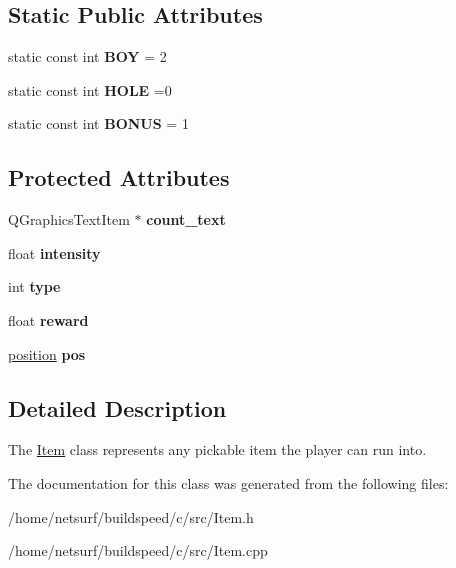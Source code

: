 \subsection*{Static Public Attributes}
\begin{DoxyCompactItemize}
\item 
static const int {\bfseries B\+OY} = 2\hypertarget{class_item_a70873a5ab783160390c311623837b5a5}{}\label{class_item_a70873a5ab783160390c311623837b5a5}

\item 
static const int {\bfseries H\+O\+LE} =0\hypertarget{class_item_abd114fce352b909292f0cf6dc89b4487}{}\label{class_item_abd114fce352b909292f0cf6dc89b4487}

\item 
static const int {\bfseries B\+O\+N\+US} = 1\hypertarget{class_item_a76b7a450081315e261c475736dfb74a3}{}\label{class_item_a76b7a450081315e261c475736dfb74a3}

\end{DoxyCompactItemize}
\subsection*{Protected Attributes}
\begin{DoxyCompactItemize}
\item 
Q\+Graphics\+Text\+Item $\ast$ {\bfseries count\+\_\+text}\hypertarget{class_item_ae17075ec9a03088db6f561c4f9c76742}{}\label{class_item_ae17075ec9a03088db6f561c4f9c76742}

\item 
float {\bfseries intensity}\hypertarget{class_item_a27b5db0436c59d6c8f91c3bc787bf793}{}\label{class_item_a27b5db0436c59d6c8f91c3bc787bf793}

\item 
int {\bfseries type}\hypertarget{class_item_a22a98aed7ce8f0314b597a5739c415b7}{}\label{class_item_a22a98aed7ce8f0314b597a5739c415b7}

\item 
float {\bfseries reward}\hypertarget{class_item_a96e9e465bc41c9b5b775281771019587}{}\label{class_item_a96e9e465bc41c9b5b775281771019587}

\item 
\hyperlink{structposition}{position} {\bfseries pos}\hypertarget{class_item_a7ec0bf2287ce0cba665689292a86e429}{}\label{class_item_a7ec0bf2287ce0cba665689292a86e429}

\end{DoxyCompactItemize}


\subsection{Detailed Description}
The \hyperlink{class_item}{Item} class represents any pickable item the player can run into. 

The documentation for this class was generated from the following files\+:\begin{DoxyCompactItemize}
\item 
/home/netsurf/buildspeed/c/src/Item.\+h\item 
/home/netsurf/buildspeed/c/src/Item.\+cpp\end{DoxyCompactItemize}
